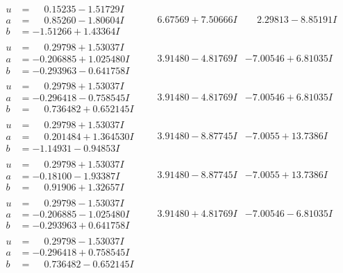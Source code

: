 \documentclass[1p]{elsarticle_modified}
\theoremstyle{definition}
\begin{document}
$$\begin{array}{c|c|c}
\begin{aligned}
u &= \phantom{-}0.15235 - 1.51729 I \\
a &= \phantom{-}0.85260 - 1.80604 I \\
b &= -1.51266 + 1.43364 I\end{aligned}
 & \phantom{-}6.67569 + 7.50666 I & \phantom{-}2.29813 - 8.85191 I \\ \hline\begin{aligned}
u &= \phantom{-}0.29798 + 1.53037 I \\
a &= -0.206885 + 1.025480 I \\
b &= -0.293963 - 0.641758 I\end{aligned}
 & \phantom{-}3.91480 - 4.81769 I & -7.00546 + 6.81035 I \\ \hline\begin{aligned}
u &= \phantom{-}0.29798 + 1.53037 I \\
a &= -0.296418 - 0.758545 I \\
b &= \phantom{-}0.736482 + 0.652145 I\end{aligned}
 & \phantom{-}3.91480 - 4.81769 I & -7.00546 + 6.81035 I \\ \hline\begin{aligned}
u &= \phantom{-}0.29798 + 1.53037 I \\
a &= \phantom{-}0.201484 + 1.364530 I \\
b &= -1.14931 - 0.94853 I\end{aligned}
 & \phantom{-}3.91480 - 8.87745 I & -7.0055 + 13.7386 I \\ \hline\begin{aligned}
u &= \phantom{-}0.29798 + 1.53037 I \\
a &= -0.18100 - 1.93387 I \\
b &= \phantom{-}0.91906 + 1.32657 I\end{aligned}
 & \phantom{-}3.91480 - 8.87745 I & -7.0055 + 13.7386 I \\ \hline\begin{aligned}
u &= \phantom{-}0.29798 - 1.53037 I \\
a &= -0.206885 - 1.025480 I \\
b &= -0.293963 + 0.641758 I\end{aligned}
 & \phantom{-}3.91480 + 4.81769 I & -7.00546 - 6.81035 I \\ \hline\begin{aligned}
u &= \phantom{-}0.29798 - 1.53037 I \\
a &= -0.296418 + 0.758545 I \\
b &= \phantom{-}0.736482 - 0.652145 I\end{aligned}

\end{array}$$
\end{document}
